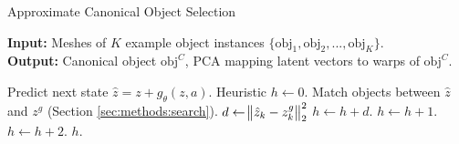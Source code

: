 \documentclass{article}
\begin{document}
\begin{algorithm}[H]

\caption{Approximate Canonical Object Selection}\label{alg:canon_select_2} 

\begin{flushleft}
    \hspace*{\algorithmicindent} \textbf{Input:} Meshes of $K$ example object instances $\{ \mathrm{obj}_1, \mathrm{obj}_2, ..., \mathrm{obj}_K \}$. \\
    \hspace*{\algorithmicindent} \textbf{Output:} Canonical object $\mathrm{obj}^C$, $\mathrm{PCA}$ mapping latent vectors to warps of $\mathrm{obj}^C$. \\
\end{flushleft}

\begin{algorithmic}[1]

    \State Predict next state $\hat{z} = z + g_{\theta}(z, a)$.
    \State Heuristic $h \leftarrow 0$.
    \State Match objects between $\hat{z}$ and $z^g$ (Section \ref{sec:methods:search}).
        \State $d \leftarrow \norm{\hat{z}_k - z^g_k}^2_2$
            \State $h \leftarrow h + d$. 
            \State $h \leftarrow h + 1$. 
        \Else
            \State $h \leftarrow h + 2$. 
        \EndIf
    \EndFor
    \State \Return $h$.

\end{algorithmic}

\end{algorithm}
\end{document}
